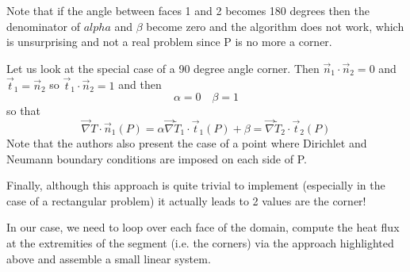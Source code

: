 Note that if the angle between faces 1 and 2 becomes 180 degrees then 
the denominator of $alpha$ and $\beta$ become zero and the 
algorithm does not work, which is unsurprising and not a real problem since P is no more a corner.

Let us look at the special case of a 90 degree angle corner. Then $\vec{n}_1 \cdot \vec{n}_2 =0$
and $\vec{t}_1 = \vec{n}_2$ so $\vec{t}_1 \cdot \vec{n}_2=1$ and then  
\[
\alpha = 0 
\quad
\beta = 1 
\]
so that
\[
\vec\nabla T \cdot \vec{n}_1(P) = 
\alpha \vec\nabla \tilde{T}_1 \cdot \vec{t}_1(P)
+
\beta 
=\vec\nabla \tilde{T}_2 \cdot \vec{t}_2(P)
\]
Note that the authors also present the case of a point where Dirichlet and Neumann
boundary conditions are imposed on each side of P.

Finally, although this approach is quite trivial to implement (especially 
in the case of a rectangular problem) it actually leads to 2 values are the 
corner!

In our case, we need to loop over each face of the domain, 
compute the heat flux at the extremities of the segment (i.e. the corners)
via the approach highlighted above and assemble a small linear system.

\begin{center}
\end{center}

